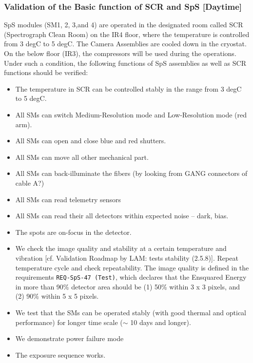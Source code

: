 \subsubsection{Validation of the Basic function of SCR and SpS [Daytime]}\label{secflow:SCR}

SpS modules (SM1, 2, 3,and 4) are operated in the designated room called SCR (Spectrograph Clean Room) on the IR4 floor, where the temperature is controlled from 3 degC to 5 degC.
The Camera Assemblies are cooled down in the cryostat.
On the below floor (IR3), the compressors will be used during the operations.
Under such a condition, the following functions of SpS assemblies as well as SCR functions should be verified:
\begin{itemize}
\item The temperature in SCR can be controlled stably in the range from 3 degC to 5 degC.
\item All SMs can switch Medium-Resolution mode and Low-Resolution mode (red arm).
\item All SMs can open and close blue and red shutters.
\item All SMs can move all other mechanical part. 
\item All SMs can back-illuminate the fibers (by looking from GANG connectors of cable A?)
\item All SMs can read telemetry sensors
\item All SMs can read their all detectors within expected noise -- dark, bias.
\item The spots are on-focus in the detector.
\item We check the image quality and stability at a certain temperature and vibration [cf. Validation Roadmap by LAM: tests stability (2.5.8)].
Repeat temperature cycle and check repeatability.
The image quality is defined in the requirements {\tt REQ-SpS-47 (Test)}, which declares that the Ensquared Energy in more than 90\% detector area should be (1) 50\% within 3 x 3 pixels, and (2) 90\% within 5 x 5 pixels.
\item We test that the SMs can be operated stably (with good thermal and optical performance) for longer time scale ($\sim$ 10 days and longer).
\item We demonstrate power failure mode
\item The exposure sequence works.
\end{itemize}

